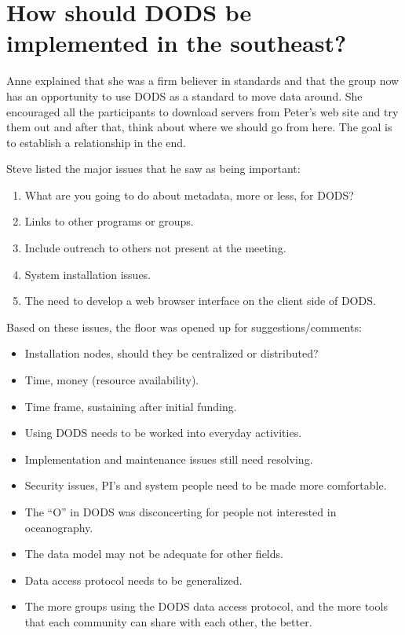 \section{How should DODS be implemented in the southeast?}

Anne explained that she was a firm believer in standards and that the
group now has an opportunity to use DODS as a standard to move data
around.  She encouraged all the participants to download servers from
Peter's web site and try them out and after that, think about where we
should go from here.  The goal is to establish a relationship in the
end.

Steve listed the major issues that he saw as being important:
\begin{enumerate}
\item What are you going to do about metadata, more or less, for DODS?
\item Links to other programs or groups.
\item Include outreach to others not present at the meeting.
\item System installation issues.
\item The need to develop a web browser interface on the client side of DODS.
\end{enumerate}

Based on these issues, the floor was opened up for suggestions/comments:
\begin{itemize}
  \item Installation nodes, should they be centralized or distributed?
  \item Time, money (resource availability).
  \item Time frame, sustaining after initial funding.
  \item Using DODS needs to be worked into everyday activities.
  \item Implementation and maintenance issues still need resolving.
  \item Security issues, PI's and system people need to be made more comfortable.
  \item The ``O'' in DODS was disconcerting for people not interested in oceanography.
  \item The data model may not be adequate for other fields.
  \item Data access protocol needs to be generalized.
  \item The more groups using the DODS data access protocol, and the
more tools that each community can share with each other, the better.
\end{itemize}

